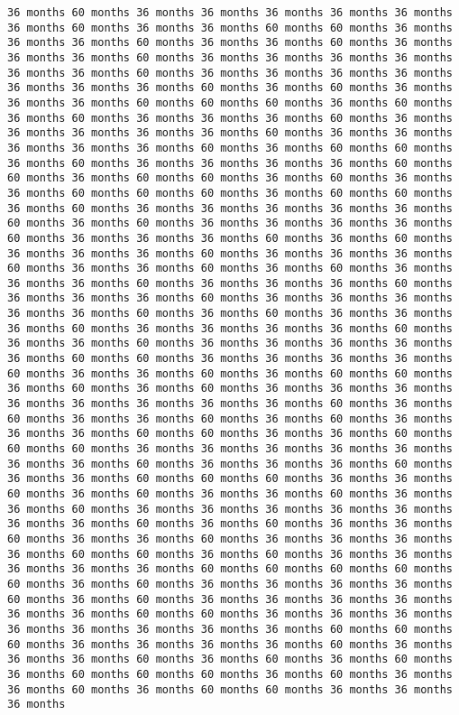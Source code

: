 \documentclass[11pt]{article}
\begin{document}
\begin{Verbatim}[commandchars=\\\{\}, frame=single, framerule=2mm, rulecolor=\color{outerrorbackground}]
36 months 60 months 36 months 36 months 36 months 36 months 36 months 36 months 60 months 36 months 36 months 60 months 60 months 36 months 36 months 36 months 60 months 36 months 36 months 60 months 36 months 36 months 36 months 60 months 36 months 36 months 36 months 36 months 36 months 36 months 60 months 36 months 36 months 36 months 36 months 36 months 36 months 36 months 60 months 36 months 60 months 36 months 36 months 36 months 60 months 60 months 60 months 36 months 60 months 36 months 60 months 36 months 36 months 36 months 60 months 36 months 36 months 36 months 36 months 36 months 60 months 36 months 36 months 36 months 36 months 36 months 60 months 36 months 60 months 60 months 36 months 60 months 36 months 36 months 36 months 36 months 60 months 60 months 36 months 60 months 60 months 36 months 60 months 36 months 36 months 60 months 60 months 60 months 36 months 60 months 60 months 36 months 60 months 36 months 36 months 36 months 36 months 36 months 60 months 36 months 60 months 36 months 36 months 36 months 36 months 60 months 36 months 36 months 36 months 60 months 36 months 60 months 36 months 36 months 36 months 60 months 36 months 36 months 36 months 60 months 36 months 36 months 60 months 36 months 60 months 36 months 36 months 36 months 60 months 36 months 36 months 36 months 60 months 36 months 36 months 36 months 60 months 36 months 36 months 36 months 36 months 36 months 60 months 36 months 60 months 36 months 36 months 36 months 60 months 36 months 36 months 36 months 36 months 60 months 36 months 36 months 60 months 36 months 36 months 36 months 36 months 36 months 60 months 60 months 36 months 36 months 36 months 36 months 60 months 36 months 36 months 60 months 36 months 60 months 60 months 36 months 60 months 36 months 60 months 36 months 36 months 36 months 36 months 36 months 36 months 36 months 36 months 60 months 36 months 60 months 36 months 36 months 60 months 36 months 60 months 36 months 36 months 36 months 60 months 60 months 36 months 36 months 60 months 60 months 60 months 36 months 36 months 36 months 36 months 36 months 36 months 36 months 60 months 36 months 36 months 36 months 60 months 36 months 36 months 60 months 60 months 60 months 36 months 36 months 60 months 36 months 60 months 36 months 36 months 60 months 36 months 36 months 60 months 36 months 36 months 36 months 36 months 36 months 36 months 36 months 60 months 36 months 60 months 36 months 36 months 60 months 36 months 36 months 60 months 36 months 36 months 36 months 36 months 60 months 60 months 36 months 60 months 36 months 36 months 36 months 36 months 36 months 60 months 60 months 60 months 60 months 60 months 36 months 60 months 36 months 36 months 36 months 36 months 60 months 36 months 60 months 36 months 36 months 36 months 36 months 36 months 36 months 60 months 60 months 36 months 36 months 36 months 36 months 36 months 36 months 36 months 36 months 60 months 60 months 60 months 36 months 36 months 36 months 36 months 60 months 36 months 36 months 36 months 60 months 36 months 60 months 36 months 60 months 36 months 60 months 60 months 60 months 36 months 60 months 36 months 36 months 60 months 36 months 60 months 60 months 36 months 36 months 36 months 
\end{Verbatim}
\end{document}
